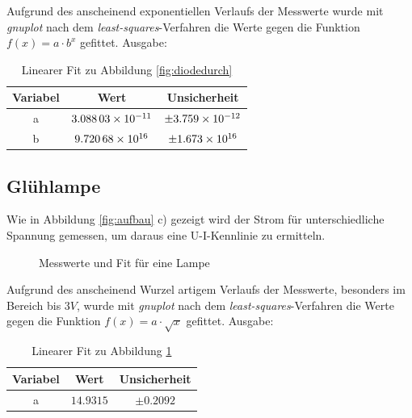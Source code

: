 Aufgrund des anscheinend exponentiellen Verlaufs der Messwerte wurde mit \emph{gnuplot} nach dem \emph{least-squares}-Verfahren die Werte gegen die Funktion $f(x)=a\cdot b^x$ gefittet. Ausgabe:
\begin{table}[H]
  \centering
  \begin{tabular}{c | c | c }
    Variabel   & Wert & Unsicherheit\\ \hline
    a & $\num{3.08803d-11}$ & $\pm\num{3.759d-12}$ \\
    b & $\num{9,72068d16}$ & $\pm\num{1.673d16}$
  \end{tabular}
  \caption{Linearer Fit zu Abbildung \ref{fig:diodedurch}}
  \label{tab:fitdiodedurch}
\end{table}
\subsection{Glühlampe}
Wie in Abbildung \ref{fig:aufbau} c) gezeigt wird der Strom für unterschiedliche Spannung gemessen, um daraus eine U-I-Kennlinie zu ermitteln.

\begin{figure}[H]
\centering
{}
\caption{Messwerte und Fit für eine Lampe}
\label{fig:Lampe}
\end{figure}
Aufgrund des anscheinend Wurzel artigem Verlaufs der Messwerte, besonders im Bereich bis $3V$, wurde mit \emph{gnuplot} nach dem \emph{least-squares}-Verfahren die Werte gegen die Funktion $f(x)=a\cdot\sqrt{x}$ gefittet. Ausgabe:
\begin{table}[H]
  \centering
  \begin{tabular}{c | c | c }
    Variabel   & Wert & Unsicherheit\\ \hline
    a & $\num{14,9315}$ & $\pm\num{0,2092}$ \\
   
  \end{tabular}
  \caption{Linearer Fit zu Abbildung \ref{fig:Lampe}}
  \label{tab:fitlampe}
\end{table}

